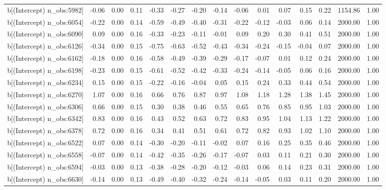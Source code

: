 \begin{table}[ht]
\begin{tabular}{rrrrrrrrrrrrrrr}
  b[(Intercept) n\_obs:5982] & -0.06 & 0.00 & 0.11 & -0.33 & -0.27 & -0.20 & -0.14 & -0.06 & 0.01 & 0.07 & 0.15 & 0.22 & 1154.86 & 1.00 \\ 
  b[(Intercept) n\_obs:6054] & -0.22 & 0.00 & 0.14 & -0.59 & -0.49 & -0.40 & -0.31 & -0.22 & -0.12 & -0.03 & 0.06 & 0.14 & 2000.00 & 1.00 \\ 
  b[(Intercept) n\_obs:6090] & 0.09 & 0.00 & 0.16 & -0.33 & -0.23 & -0.11 & -0.01 & 0.09 & 0.20 & 0.30 & 0.41 & 0.51 & 2000.00 & 1.00 \\ 
  b[(Intercept) n\_obs:6126] & -0.34 & 0.00 & 0.15 & -0.75 & -0.63 & -0.52 & -0.43 & -0.34 & -0.24 & -0.15 & -0.04 & 0.07 & 2000.00 & 1.00 \\ 
  b[(Intercept) n\_obs:6162] & -0.18 & 0.00 & 0.16 & -0.58 & -0.49 & -0.39 & -0.29 & -0.17 & -0.07 & 0.01 & 0.12 & 0.24 & 2000.00 & 1.00 \\ 
  b[(Intercept) n\_obs:6198] & -0.23 & 0.00 & 0.15 & -0.61 & -0.52 & -0.42 & -0.33 & -0.24 & -0.14 & -0.05 & 0.06 & 0.16 & 2000.00 & 1.00 \\ 
  b[(Intercept) n\_obs:6234] & 0.15 & 0.00 & 0.15 & -0.22 & -0.16 & -0.04 & 0.05 & 0.15 & 0.24 & 0.33 & 0.44 & 0.54 & 2000.00 & 1.00 \\ 
  b[(Intercept) n\_obs:6270] & 1.07 & 0.00 & 0.16 & 0.66 & 0.76 & 0.87 & 0.97 & 1.08 & 1.18 & 1.28 & 1.38 & 1.45 & 2000.00 & 1.00 \\ 
  b[(Intercept) n\_obs:6306] & 0.66 & 0.00 & 0.15 & 0.30 & 0.38 & 0.46 & 0.55 & 0.65 & 0.76 & 0.85 & 0.95 & 1.03 & 2000.00 & 1.00 \\ 
  b[(Intercept) n\_obs:6342] & 0.83 & 0.00 & 0.16 & 0.43 & 0.52 & 0.63 & 0.72 & 0.83 & 0.95 & 1.04 & 1.13 & 1.22 & 2000.00 & 1.00 \\ 
  b[(Intercept) n\_obs:6378] & 0.72 & 0.00 & 0.16 & 0.34 & 0.41 & 0.51 & 0.61 & 0.72 & 0.82 & 0.93 & 1.02 & 1.10 & 2000.00 & 1.00 \\ 
  b[(Intercept) n\_obs:6522] & 0.07 & 0.00 & 0.14 & -0.30 & -0.20 & -0.11 & -0.02 & 0.07 & 0.16 & 0.25 & 0.35 & 0.46 & 2000.00 & 1.00 \\ 
  b[(Intercept) n\_obs:6558] & -0.07 & 0.00 & 0.14 & -0.42 & -0.35 & -0.26 & -0.17 & -0.07 & 0.03 & 0.11 & 0.21 & 0.30 & 2000.00 & 1.00 \\ 
  b[(Intercept) n\_obs:6594] & -0.03 & 0.00 & 0.13 & -0.38 & -0.28 & -0.20 & -0.12 & -0.03 & 0.06 & 0.14 & 0.23 & 0.31 & 2000.00 & 1.00 \\ 
  b[(Intercept) n\_obs:6630] & -0.14 & 0.00 & 0.13 & -0.49 & -0.40 & -0.32 & -0.24 & -0.14 & -0.05 & 0.03 & 0.11 & 0.20 & 2000.00 & 1.00 \\ 

\end{tabular}
\end{table}

